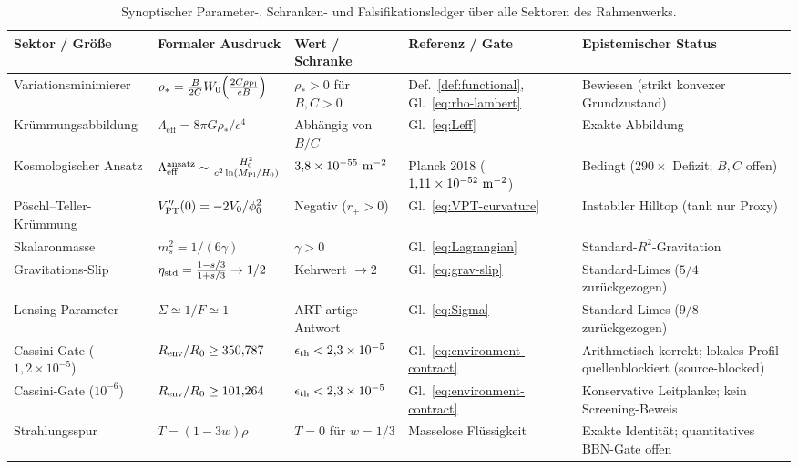 \documentclass[12pt,a4paper]{article}
\theoremstyle{definition}
\theoremstyle{plain}
\theoremstyle{remark}
\newcommand{\Leff}{\Lambda_{\mathrm{eff}}}
\begin{document}
\begin{table}[htbp]
\centering
\small
\renewcommand{\arraystretch}{1.15}
\caption{Synoptischer Parameter-, Schranken- und Falsifikationsledger über alle Sektoren des Rahmenwerks.}
\label{tab:parameter-schranken-ledger}\label{tab:parameter-bounds-ledger}
\begin{tabularx}{\linewidth}{@{}L{2.6cm}L{2.8cm}L{2.5cm}L{2.5cm}Y@{}}
\toprule
\textbf{Sektor / Größe} & \textbf{Formaler Ausdruck} & \textbf{Wert / Schranke} & \textbf{Referenz / Gate} & \textbf{Epistemischer Status}\\
\midrule
Variationsminimierer & $\rho_\ast = \frac{B}{2C} W_0\!\left(\frac{2C\rho_{\rm Pl}}{eB}\right)$ & $\rho_\ast > 0$ für $B,C>0$ & Def.~\ref{def:functional}, Gl.~\eqref{eq:rho-lambert} & Bewiesen (strikt konvexer Grundzustand)\\
Krümmungsabbildung & $\Leff = 8\pi G\rho_\ast/c^4$ & Abhängig von $B/C$ & Gl.~\eqref{eq:Leff} & Exakte Abbildung\\
Kosmologischer Ansatz & $\Leff^{\rm ansatz} \sim \frac{H_0^2}{c^2\ln(M_{\rm Pl}/H_0)}$ & $3{,}8\times 10^{-55}\ {\rm m}^{-2}$ & Planck 2018 ($1{,}11\times 10^{-52}\ {\rm m}^{-2}$) & Bedingt ($290\times$ Defizit; $B, C$ offen)\\
Pöschl--Teller-Krümmung & $V_{\rm PT}''(0) = -2V_0/\phi_0^2$ & Negativ ($r_+ > 0$) & Gl.~\eqref{eq:VPT-curvature} & Instabiler Hilltop (tanh nur Proxy)\\
Skalaronmasse & $m_s^2 = 1/(6\gamma)$ & $\gamma > 0$ & Gl.~\eqref{eq:Lagrangian} & Standard-$R^2$-Gravitation\\
Gravitations-Slip & $\eta_{\rm std} = \frac{1-s/3}{1+s/3} \to 1/2$ & Kehrwert $\to 2$ & Gl.~\eqref{eq:grav-slip} & Standard-Limes ($5/4$ zurückgezogen)\\
Lensing-Parameter & $\Sigma \simeq 1/F \simeq 1$ & ART-artige Antwort & Gl.~\eqref{eq:Sigma} & Standard-Limes ($9/8$ zurückgezogen)\\
Cassini-Gate ($1{,}2\times 10^{-5}$) & $R_{\rm env}/R_0 \ge 350{,}787$ & $\epsilon_{\rm th} < 2{,}3\times 10^{-5}$ & Gl.~\eqref{eq:environment-contract} & Arithmetisch korrekt; lokales Profil quellenblockiert (source-blocked)\\
Cassini-Gate ($10^{-6}$) & $R_{\rm env}/R_0 \ge 101{,}264$ & $\epsilon_{\rm th} < 2{,}3\times 10^{-5}$ & Gl.~\eqref{eq:environment-contract} & Konservative Leitplanke; kein Screening-Beweis\\
Strahlungsspur & $T = (1-3w)\rho$ & $T = 0$ für $w=1/3$ & Masselose Flüssigkeit & Exakte Identität; quantitatives BBN-Gate offen\\
\bottomrule
\end{tabularx}
\end{table}
\end{document}
